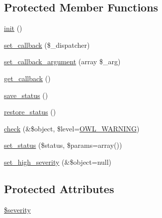 \subsection*{Protected Member Functions}
\begin{DoxyCompactItemize}
\item 
\hyperlink{class__OWL_ae0ef3ded56e8a6b34b6461e5a721cd3e}{init} ()
\item 
\hyperlink{class__OWL_a28d9025eaf37b49d63cb334ed28c33f0}{set\_\-callback} (\$\_\-dispatcher)
\item 
\hyperlink{class__OWL_a1e26611ce858b237f5a98a91ea3c3a1b}{set\_\-callback\_\-argument} (array \$\_\-arg)
\item 
\hyperlink{class__OWL_abded13b1c97ea6e0cfe3c68cb6bcf7a5}{get\_\-callback} ()
\item 
\hyperlink{class__OWL_a9e49b9c76fbc021b244c6915ea536d71}{save\_\-status} ()
\item 
\hyperlink{class__OWL_a465eeaf40edd9f9c848841700c32ce55}{restore\_\-status} ()
\item 
\hyperlink{class__OWL_ae2e3c56e5f3c4ce4156c6b1bb1c50f63}{check} (\&\$object, \$level=\hyperlink{owl_8severitycodes_8php_ace886152e2e86cd2e91cb833fd495adb}{OWL\_\-WARNING})
\item 
\hyperlink{class__OWL_aea912d0ede9b3c2a69b79072d94d4787}{set\_\-status} (\$status, \$params=array())
\item 
\hyperlink{class__OWL_a576829692a3b66e3d518853bf43abae3}{set\_\-high\_\-severity} (\&\$object=null)
\end{DoxyCompactItemize}
\subsection*{Protected Attributes}
\begin{DoxyCompactItemize}
\item 
\hyperlink{class__OWL_ad26b40a9dbbacb33e299b17826f8327c}{\$severity}
\end{DoxyCompactItemize}
